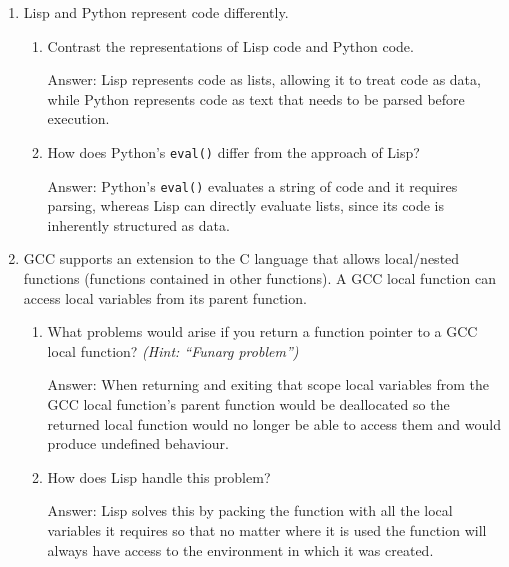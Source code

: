 \documentclass[12pt,letterpaper]{ntdhw}
\begin{document}
\begin{enumerate}
  \item Lisp and Python represent code differently.

  \begin{enumerate}
    \item Contrast the representations of Lisp code and Python code.

    \begin{emph}
      Answer: Lisp represents code as lists, allowing it to treat code as data, while Python represents code as text that needs to be parsed before execution.
    \end{emph}

    \item How does Python's {\tt eval()} differ from the approach of Lisp?

    \begin{emph}
      Answer:  Python’s {\tt eval()} evaluates a string of code and it requires parsing, whereas Lisp can directly evaluate lists, since its code is inherently structured as data.
    \end{emph}
  \end{enumerate}

  \item GCC supports an extension to the C language that allows
  local/nested functions (functions contained in other functions).  A
  GCC local function can access local variables from its parent
  function.
  \begin{enumerate}
    \item What problems would arise if you return a function pointer
    to a GCC local function? \emph{(Hint: ``Funarg problem'')}

    \begin{emph}
      Answer: When returning and exiting that scope local variables from the GCC local function's parent function would be deallocated so the returned local function would no longer be able to access them and would produce undefined behaviour.
    \end{emph}

    \item How does Lisp handle this problem?

    \begin{emph}
      Answer: Lisp solves this by packing the function with all the local variables it requires so that no matter where it is used the function will always have access to the environment in which it was created.
    \end{emph}


\end{enumerate}
\end{enumerate}
\end{document}
